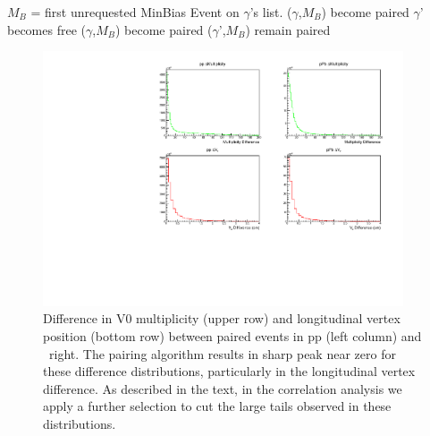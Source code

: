 \FloatBarrier
\begin{algorithmic}
  \State \(M_B\) = first unrequested MinBias Event on \(\gamma\)'s list.
  \State (\(\gamma\),\(M_B\)) become paired
  \State \(\gamma\)' becomes free
  \State (\(\gamma\),\(M_B\)) become paired
  \Else
  \State (\(\gamma\)',\(M_B\)) remain paired
  \EndIf
  \EndIf
  \EndWhile
  \EndProcedure
\end{algorithmic}

\begin{figure}[h]
  \center
  \includegraphics[width=0.95\textwidth]{Data_Analysis/EventMixing/pPb_Differences.pdf}
  \caption{Difference in V0 multiplicity
  (upper row) and longitudinal vertex position (bottom row) between paired events in pp (left column) and \pPb~right. The pairing algorithm results in sharp peak near zero for these difference distributions, particularly in the longitudinal vertex difference. As described in the text, in the correlation analysis we apply a further selection to cut the large tails observed in these distributions. }
  \label{Difference_distributions}
\end{figure}

